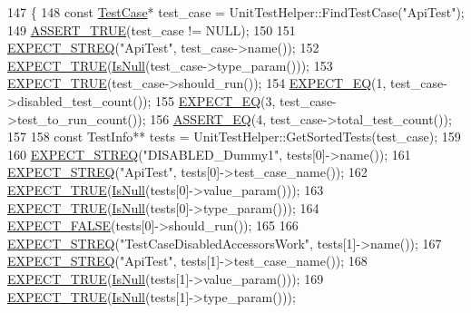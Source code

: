 \begin{DoxyCode}
147                                               \{
148   \textcolor{keyword}{const} \hyperlink{namespacegmock__test__utils_a959c5af591e4d49b6d35745205b64509}{TestCase}* test\_case = UnitTestHelper::FindTestCase(\textcolor{stringliteral}{"ApiTest"});
149   \hyperlink{gtest_8h_ae9244bfbda562e8b798789b001993fa5}{ASSERT\_TRUE}(test\_case != NULL);
150 
151   \hyperlink{gtest_8h_ad20f7b94ac5081e16f0005b94e95f0c6}{EXPECT\_STREQ}(\textcolor{stringliteral}{"ApiTest"}, test\_case->name());
152   \hyperlink{gtest_8h_ac33e7cdfb5d44a7a0f0ab552eb5c3c6a}{EXPECT\_TRUE}(\hyperlink{namespacetesting_1_1internal_adcfd37a66bc4cb0e8291cf46e1a6c72b}{IsNull}(test\_case->type\_param()));
153   \hyperlink{gtest_8h_ac33e7cdfb5d44a7a0f0ab552eb5c3c6a}{EXPECT\_TRUE}(test\_case->should\_run());
154   \hyperlink{gtest_8h_a4159019abda84f5366acdb7604ff220a}{EXPECT\_EQ}(1, test\_case->disabled\_test\_count());
155   \hyperlink{gtest_8h_a4159019abda84f5366acdb7604ff220a}{EXPECT\_EQ}(3, test\_case->test\_to\_run\_count());
156   \hyperlink{gtest_8h_a1a6db8b1338ee7040329322b77779086}{ASSERT\_EQ}(4, test\_case->total\_test\_count());
157 
158   \textcolor{keyword}{const} TestInfo** tests = UnitTestHelper::GetSortedTests(test\_case);
159 
160   \hyperlink{gtest_8h_ad20f7b94ac5081e16f0005b94e95f0c6}{EXPECT\_STREQ}(\textcolor{stringliteral}{"DISABLED\_Dummy1"}, tests[0]->name());
161   \hyperlink{gtest_8h_ad20f7b94ac5081e16f0005b94e95f0c6}{EXPECT\_STREQ}(\textcolor{stringliteral}{"ApiTest"}, tests[0]->test\_case\_name());
162   \hyperlink{gtest_8h_ac33e7cdfb5d44a7a0f0ab552eb5c3c6a}{EXPECT\_TRUE}(\hyperlink{namespacetesting_1_1internal_adcfd37a66bc4cb0e8291cf46e1a6c72b}{IsNull}(tests[0]->value\_param()));
163   \hyperlink{gtest_8h_ac33e7cdfb5d44a7a0f0ab552eb5c3c6a}{EXPECT\_TRUE}(\hyperlink{namespacetesting_1_1internal_adcfd37a66bc4cb0e8291cf46e1a6c72b}{IsNull}(tests[0]->type\_param()));
164   \hyperlink{gtest_8h_aeb6c7ae89f440c90c1a1815951c836da}{EXPECT\_FALSE}(tests[0]->should\_run());
165 
166   \hyperlink{gtest_8h_ad20f7b94ac5081e16f0005b94e95f0c6}{EXPECT\_STREQ}(\textcolor{stringliteral}{"TestCaseDisabledAccessorsWork"}, tests[1]->name());
167   \hyperlink{gtest_8h_ad20f7b94ac5081e16f0005b94e95f0c6}{EXPECT\_STREQ}(\textcolor{stringliteral}{"ApiTest"}, tests[1]->test\_case\_name());
168   \hyperlink{gtest_8h_ac33e7cdfb5d44a7a0f0ab552eb5c3c6a}{EXPECT\_TRUE}(\hyperlink{namespacetesting_1_1internal_adcfd37a66bc4cb0e8291cf46e1a6c72b}{IsNull}(tests[1]->value\_param()));
169   \hyperlink{gtest_8h_ac33e7cdfb5d44a7a0f0ab552eb5c3c6a}{EXPECT\_TRUE}(\hyperlink{namespacetesting_1_1internal_adcfd37a66bc4cb0e8291cf46e1a6c72b}{IsNull}(tests[1]->type\_param()));

\end{DoxyCode}
